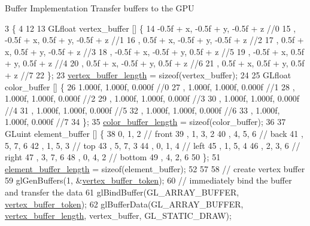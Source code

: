 Buffer Implementation Transfer buffers to the G\+P\+U
\begin{DoxyCode}
3                                                     \{
4 
12 
13   GLfloat vertex\_buffer [] \{
14       -0.5f + x, -0.5f + y, -0.5f + z   \textcolor{comment}{//0}
15     , -0.5f + x,  0.5f + y, -0.5f + z   \textcolor{comment}{//1}
16     ,  0.5f + x, -0.5f + y, -0.5f + z   \textcolor{comment}{//2}
17     ,  0.5f + x,  0.5f + y, -0.5f + z   \textcolor{comment}{//3}
18     , -0.5f + x, -0.5f + y,  0.5f + z   \textcolor{comment}{//5}
19     , -0.5f + x,  0.5f + y,  0.5f + z   \textcolor{comment}{//4}
20     ,  0.5f + x, -0.5f + y,  0.5f + z   \textcolor{comment}{//6}
21     ,  0.5f + x,  0.5f + y,  0.5f + z   \textcolor{comment}{//7}
22   \};
23   \hyperlink{classCubeAsset_a3054ed8a7d6cc1575aebdfc40038847b}{vertex\_buffer\_length} = \textcolor{keyword}{sizeof}(vertex\_buffer);
24 
25   GLfloat color\_buffer [] \{
26       1.000f, 1.000f, 0.000f \textcolor{comment}{//0}
27     , 1.000f, 1.000f, 0.000f \textcolor{comment}{//1}
28     , 1.000f, 1.000f, 0.000f \textcolor{comment}{//2}
29     , 1.000f, 1.000f, 0.000f \textcolor{comment}{//3}
30     , 1.000f, 1.000f, 0.000f \textcolor{comment}{//4}
31     , 1.000f, 1.000f, 0.000f \textcolor{comment}{//5}
32     , 1.000f, 1.000f, 0.000f \textcolor{comment}{//6}
33     , 1.000f, 1.000f, 0.000f \textcolor{comment}{//7}
34   \};
35   \hyperlink{classCubeAsset_ac4c2395c395e9bcebc5d15d425a505ec}{color\_buffer\_length} = \textcolor{keyword}{sizeof}(color\_buffer);
36 
37   GLuint element\_buffer []  \{
38       0, 1, 2  \textcolor{comment}{// front}
39     , 1, 3, 2  
40     , 4, 5, 6  \textcolor{comment}{// back}
41     , 5, 7, 6  
42     , 1, 5, 3  \textcolor{comment}{// top}
43     , 5, 7, 3 
44     , 0, 1, 4  \textcolor{comment}{// left}
45     , 1, 5, 4  
46     , 2, 3, 6  \textcolor{comment}{// right}
47     , 3, 7, 6  
48     , 0, 4, 2  \textcolor{comment}{// bottom}
49     , 4, 2, 6     
50   \};
51   \hyperlink{classCubeAsset_ac66c2ec869f392515dad4ebda1fe4792}{element\_buffer\_length} = \textcolor{keyword}{sizeof}(element\_buffer);
52 
57 
58   \textcolor{comment}{// create vertex buffer}
59   glGenBuffers(1, &\hyperlink{classCubeAsset_a31bd098f60e2c24988316a9cc9335987}{vertex\_buffer\_token});
60   \textcolor{comment}{// immediately bind the buffer and transfer the data}
61   glBindBuffer(GL\_ARRAY\_BUFFER, \hyperlink{classCubeAsset_a31bd098f60e2c24988316a9cc9335987}{vertex\_buffer\_token});
62   glBufferData(GL\_ARRAY\_BUFFER, \hyperlink{classCubeAsset_a3054ed8a7d6cc1575aebdfc40038847b}{vertex\_buffer\_length}, vertex\_buffer, GL\_STATIC\_DRAW);

\end{DoxyCode}
